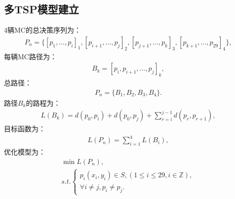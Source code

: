 \documentclass{whutmod}
\begin{document}
        \subsection{多TSP模型建立}
            4辆MC的总决策序列为：
            \begin{gather*}
                P_n = \{[p_1, \dots, p_i]_1, [p_{i+1}, \dots, p_j]_2, [p_{j+1}, \dots, p_k]_3, [p_{k+1}, \dots, p_{29}]_4\},
            \end{gather*}
            每辆MC路径为：
            \begin{gather*}
                B_k = [p_i, p_{i+1}, \dots, p_j]_k,
            \end{gather*}
            总路径：
            \begin{gather*}
                P_n = \{B_1, B_2, B_3, B_4\}.
            \end{gather*}
            路径$B_k$的路程为：
            \begin{gather*}
                L(B_k) = d(p_0, p_i) + d(p_0, p_j) + \sum_{r=i}^{j-1} d(p_r, p_{r+1}),
            \end{gather*}
            目标函数为：
            \begin{gather}
                L(P_n) = \sum_{i=1}^{4} L(B_i),
            \end{gather}
            优化模型为：
            \begin{gather}
                \min L(P_n), \\
                s.t. \left\{
                \begin{matrix}
                    p_i(x_i, y_i) \in S, (1 \leqslant i \leqslant 29, i \in \mathbb{Z}), \\
                    \forall i \neq j, p_i \neq p_j.
                \end{matrix}
                \right.
            \end{gather}
\end{document}
